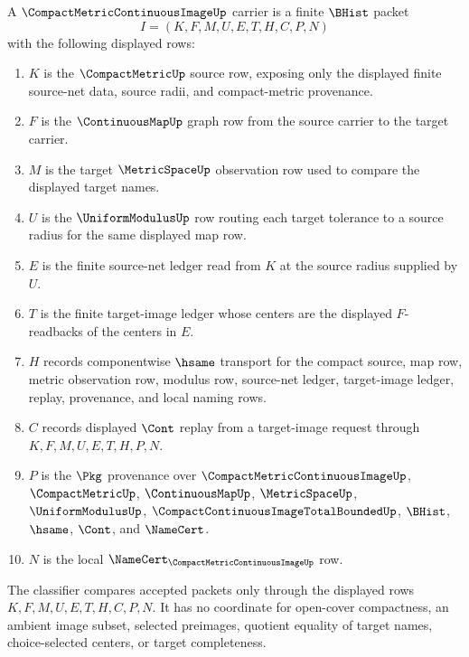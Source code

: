 \begin{definition}
\label{def:compact-metric-continuous-image-carrier}
A $\CompactMetricContinuousImageUp$ carrier is a finite $\BHist$ packet
$$
I=(K,F,M,U,E,T,H,C,P,N)
$$
with the following displayed rows:
\begin{enumerate}
\item $K$ is the $\CompactMetricUp$ source row, exposing only the displayed finite source-net data, source radii, and compact-metric provenance.
\item $F$ is the $\ContinuousMapUp$ graph row from the source carrier to the target carrier.
\item $M$ is the target $\MetricSpaceUp$ observation row used to compare the displayed target names.
\item $U$ is the $\UniformModulusUp$ row routing each target tolerance to a source radius for the same displayed map row.
\item $E$ is the finite source-net ledger read from $K$ at the source radius supplied by $U$.
\item $T$ is the finite target-image ledger whose centers are the displayed $F$-readbacks of the centers in $E$.
\item $H$ records componentwise $\hsame$ transport for the compact source, map row, metric observation row, modulus row, source-net ledger, target-image ledger, replay, provenance, and local naming rows.
\item $C$ records displayed $\Cont$ replay from a target-image request through $K,F,M,U,E,T,H,P,N$.
\item $P$ is the $\Pkg$ provenance over $\CompactMetricContinuousImageUp$, $\CompactMetricUp$, $\ContinuousMapUp$, $\MetricSpaceUp$, $\UniformModulusUp$, $\CompactContinuousImageTotalBoundedUp$, $\BHist$, $\hsame$, $\Cont$, and $\NameCert$.
\item $N$ is the local $\NameCert_{\CompactMetricContinuousImageUp}$ row.
\end{enumerate}
The classifier compares accepted packets only through the displayed rows $K,F,M,U,E,T,H,C,P,N$. It has no coordinate for open-cover compactness, an ambient image subset, selected preimages, quotient equality of target names, choice-selected centers, or target completeness.
\end{definition}

